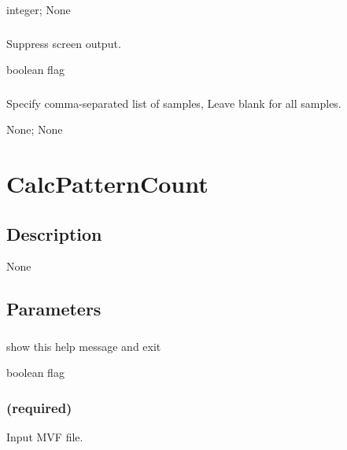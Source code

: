 \documentclass[letterpaper,11pt,english]{sphinxmanual}
\begin{document}
 integer;  None


\subsubsection{}
\label{\detokenize{prog_desc:id64}}
 Suppress screen output.

 boolean flag


\subsubsection{}
\label{\detokenize{prog_desc:id65}}
 Specify comma-separated list of samples, Leave blank for all samples.

 None;  None


\section{CalcPatternCount}
\label{\detokenize{prog_desc:calcpatterncount}}

\subsection{Description}
\label{\detokenize{prog_desc:id66}}
None


\subsection{Parameters}
\label{\detokenize{prog_desc:id67}}

\subsubsection{}
\label{\detokenize{prog_desc:id68}}
 show this help message and exit

 boolean flag


\subsubsection{ (required)}
\label{\detokenize{prog_desc:id69}}
 Input MVF file.
\end{document}
